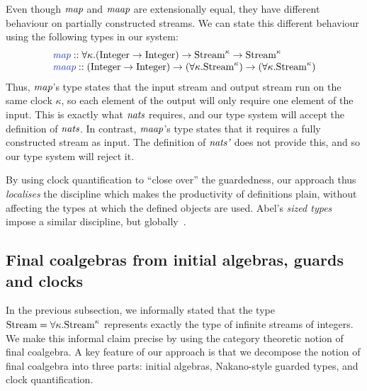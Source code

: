 Even though $\textit{map}$ and $\textit{maap}$ are extensionally equal,
they have different behaviour on partially constructed streams. We can
state this different behaviour using the following types in our system:
\begin{displaymath}
  \begin{array}{l}
    \defn{map} :: \forall \kappa. (\tyname{Integer} \to \tyname{Integer}) \to \tyname{Stream}^\kappa \to \tyname{Stream}^\kappa \\
    \defn{maap} :: (\tyname{Integer} \to \tyname{Integer}) \to (\forall \kappa. \tyname{Stream}^\kappa) \to (\forall \kappa. \tyname{Stream}^\kappa)
  \end{array}
\end{displaymath}
Thus, $\textit{map}$'s type states that the input stream and output
stream run on the same clock $\kappa$, so each element of the output
will only require one element of the input. This is exactly what
$\textit{nats}$ requires, and our type system will accept the
definition of $\textit{nats}$. In contrast, $\textit{maap}$'s type
states that it requires a fully constructed stream as input. The
definition of $\textit{nats'}$ does not provide this, and so our type
system will reject it.

By using clock quantification to ``close over'' the guardedness, our
approach thus \emph{localises} the discipline which makes the
productivity of definitions plain, without affecting the types at
which the defined objects are used. Abel's \emph{sized types} impose a
similar discipline, but globally~\cite{abel04termination}.

\subsection{Final coalgebras from initial algebras, guards and clocks}
\label{sec:main-results-intro}

In the previous subsection, we informally stated that the type
$\textrm{Stream} = \forall \kappa. \textrm{Stream}^\kappa$ represents
exactly the type of infinite streams of integers. We make this
informal claim precise by using the category theoretic notion of final
coalgebra. A key feature of our approach is that we decompose the
notion of final coalgebra into three parts: initial algebras,
Nakano-style guarded types, and clock quantification.

